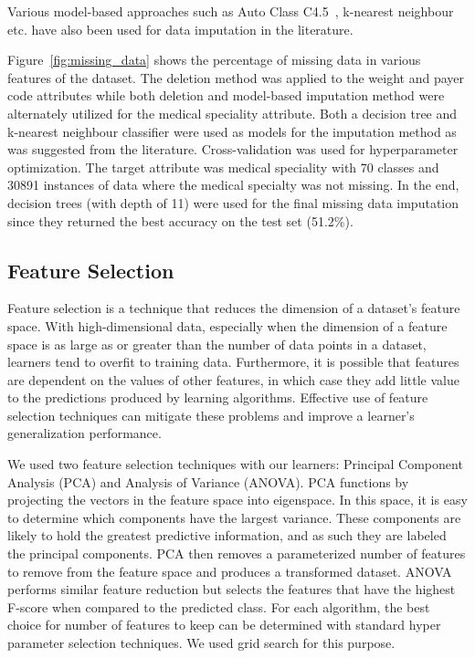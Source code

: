 \documentclass[conference]{IEEEtran}
\begin{document}
Various model-based approaches such as Auto Class C4.5~\cite{lakshminarayan-1999}, k-nearest neighbour~\cite{gustavo-2003} etc. have also been used for data imputation in the literature. 

Figure~\ref{fig:missing_data} shows the percentage of missing data in various features of the dataset. The deletion method was applied to the weight and payer code attributes while both deletion and model-based imputation method were alternately utilized for the medical speciality attribute. Both a decision tree  and k-nearest neighbour classifier were used as models for the imputation method as was suggested from the literature. Cross-validation was used for hyperparameter optimization. The target attribute was medical speciality with 70 classes and 30891 instances of data where the medical specialty was not missing. In the end, decision trees (with depth of 11) were used for the final missing data imputation since they returned the best accuracy on the test set (51.2\%).

\subsection{Feature Selection}
Feature selection is a technique that reduces the dimension of a dataset's feature space. With high-dimensional data, especially when the dimension of a feature space is as large as or greater than the number of data points in a dataset, learners tend to overfit to training data. Furthermore, it is possible that features are dependent on the values of other features, in which case they add little value to the predictions produced by learning algorithms. Effective use of feature selection techniques can mitigate these problems and improve a learner's generalization performance. 

We used two feature selection techniques with our learners: Principal Component Analysis (PCA) and Analysis of Variance (ANOVA). PCA functions by projecting the vectors in the feature space into eigenspace. In this space, it is easy to determine which components have the largest variance. These components are likely to hold the greatest predictive information, and as such they are labeled the principal components. PCA then removes a parameterized number of features to remove from the feature space and produces a transformed dataset. ANOVA performs similar feature reduction but selects the features that have the highest F-score when compared to the predicted class. For each algorithm, the best choice for number of features to keep can be determined with standard hyper parameter selection techniques. We used grid search for this purpose.
\end{document}
